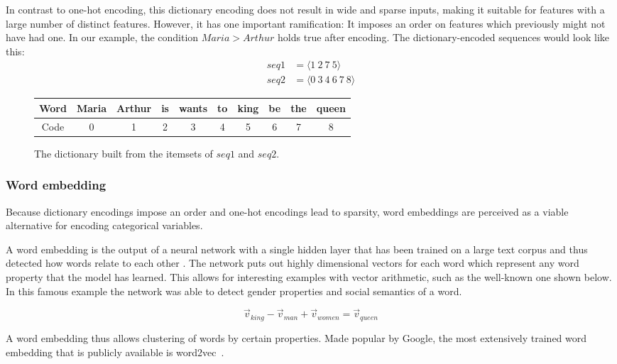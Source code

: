 In contrast to one-hot encoding, this dictionary encoding does not result in wide and sparse inputs, making it suitable for features with a large number of distinct features. However, it has one important ramification: It imposes an order on features which previously might not have had one. In our example, the condition $Maria > Arthur$ holds true after encoding. The dictionary-encoded sequences would look like this:
\begin{equation*}
    \begin{split}
        seq1 &= \langle1\ 2\ 7\ 5\rangle\\
        seq2 &= \langle0\ 3\ 4\ 6\ 7\ 8\rangle
    \end{split}
\end{equation*}

\begin{figure}
    \centering
    \begin{tabular}{c|ccccccccc}
        Word & Maria & Arthur & is & wants & to & king & be & the & queen\\
        \hline
        Code & 0 & 1 & 2 & 3 & 4 & 5 & 6 & 7 & 8
    \end{tabular}
    \caption{The dictionary built from the itemsets of $seq1$ and $seq2$.}
    \label{tab:dictionary-encoding}
\end{figure}

\subsubsection*{Word embedding}
Because dictionary encodings impose an order and one-hot encodings lead to sparsity, word embeddings are perceived as a viable alternative for encoding categorical variables.

A word embedding is the output of a neural network with a single hidden layer that has been trained on a large text corpus and thus detected how words relate to each other \cite{web:word-embedding}. The network puts out highly dimensional vectors for each word which represent any word property that the model has learned. This allows for interesting examples with vector arithmetic, such as the well-known one shown below. In this famous example the network was able to detect gender properties and social semantics of a word.

$$
    \vec{v}_{king} - \vec{v}_{man} + \vec{v}_{women} = \vec{v}_{queen}
$$

A word embedding thus allows clustering of words by certain properties.
Made popular by Google, the most extensively trained word embedding that is publicly available is word2vec~\cite{web:ahogrammer, goldberg2014word2vec}.

